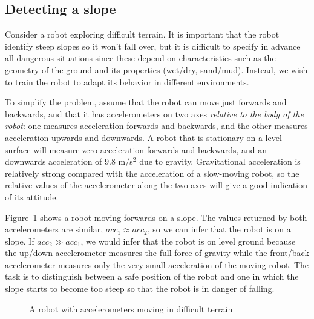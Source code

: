 \subsection{Detecting a slope}\label{s.detect-slope}

Consider a robot exploring difficult terrain. It is important that the robot identify steep slopes so it won't fall over, but it is difficult to specify in advance all dangerous situations since these depend on characteristics such as the geometry of the ground and its properties (wet/dry, sand/mud). Instead, we wish to train the robot to adapt its behavior in different environments.

To simplify the problem, assume that the robot can move just forwards and backwards, and that it has accelerometers on two axes \emph{relative to the body of the robot}: one measures acceleration forwards and backwards, and the other measures acceleration upwards and downwards. A robot that is stationary on a level surface will measure zero acceleration forwards and backwards, and an downwards acceleration of $9.8$ m/s$^{2}$ due to gravity. Gravitational acceleration is relatively strong compared with the acceleration of a slow-moving robot, so the relative values of the accelerometer along the two axes will give a good indication of its attitude.

Figure~\ref{fig.slopes} shows a robot moving forwards on a slope. The values returned by both accelerometers are similar, $\mathit{acc}_1\approx \mathit{acc}_2$, so we can infer that the robot is on a slope. If $\mathit{acc}_2\gg\mathit{acc}_1$, we would infer that the robot is on level ground because the up/down accelerometer measures the full force of gravity while the front/back accelerometer measures only the very small acceleration of the moving robot. The task is to distinguish between a safe position of the robot and one in which the slope starts to become too steep so that the robot is in danger of falling.

\begin{figure}
\begin{center}
\end{center}
\caption{A robot with accelerometers moving in difficult terrain}\label{fig.slopes}
\end{figure}

